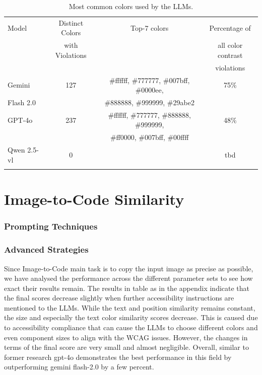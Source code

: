 \begin{table}[ht]
\centering
\caption{Most common colors used by the LLMs.}
  \label{tab:colors}
  \begin{tabular}{lccc}
  \toprule
  Model        & Distinct Colors                 & Top-7 colors     & Percentage of       \\
               &         with Violations         &                  & all color contrast   \\ 
               &                                 &                  &  violations          \\ \midrule
  Gemini       & 127          & \#ffffff, \#777777, \#007bff, \#0000ee,  & 75\% \\
  Flash 2.0             &              & \#888888, \#999999, \#29abe2              &  \\
  GPT-4o       & 237          & \#ffffff, \#777777, \#888888, \#999999,  & 48\%  \\
      &              & \#ff0000, \#007bff, \#00ffff              &  \\
  Qwen 2.5-vl  & 0            &     & tbd \\
               &              &     &     \\
  \bottomrule
  \end{tabular}
\end{table}


\section{Image-to-Code Similarity}
\subsubsection{Prompting Techniques}
\subsubsection{Advanced Strategies}
Since Image-to-Code main task is to copy the input image as precise as possible,
we have analysed the performance across the different parameter sets to see how 
exact their results remain. The results in table as in the appendix 
indicate that the final scores decrease slightly when further accessibility 
instructions are mentioned to the LLMs. While the text and position similarity 
remains constant, the size and especially the text color similarity scores 
decrease. This is caused due to accessibility compliance that can cause the
LLMs to choose different colors and even component sizes to align with the 
WCAG issues. However, the changes in terms of the final score are very small 
and almost negligible.\newline
Overall, similar to former research gpt-4o demonstrates the best performance 
in this field by outperforming gemini flash-2.0 by a few percent.




